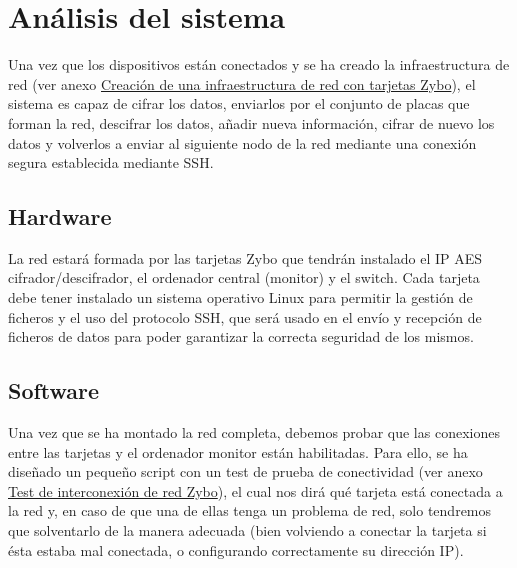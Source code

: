 \section{Análisis del sistema}
Una vez que los dispositivos están conectados y se ha creado la infraestructura de red (ver anexo \hyperlink{CreacionInfraestructura}{Creación de una infraestructura de red con tarjetas Zybo}), el sistema es capaz de cifrar los datos, enviarlos por el conjunto de placas que forman la red, descifrar los datos, añadir nueva información, cifrar de nuevo los datos y volverlos a enviar al siguiente nodo de la red mediante una conexión segura establecida mediante SSH.

\subsection{Hardware}
La red estará formada por las tarjetas Zybo que tendrán instalado el IP AES cifrador/descifrador, el ordenador central (monitor) y el switch. Cada tarjeta debe tener instalado un sistema operativo Linux para permitir la gestión de ficheros y el uso del protocolo SSH, que será usado en el envío y recepción de ficheros de datos para poder garantizar la correcta seguridad de los mismos.

\subsection{Software}
Una vez que se ha montado la red completa, debemos probar que las conexiones entre las tarjetas y el ordenador monitor están habilitadas. Para ello, se ha diseñado un pequeño script con un test de prueba de conectividad (ver anexo \hyperlink{TestConexion}{Test de interconexión de red Zybo}), el cual nos dirá qué tarjeta está conectada a la red y, en caso de que una de ellas tenga un problema de red, solo tendremos que solventarlo de la manera adecuada (bien volviendo a conectar la tarjeta si ésta estaba mal conectada, o configurando correctamente su dirección IP).

